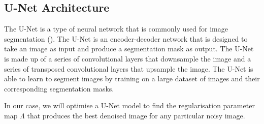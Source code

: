 \documentclass[12pt]{article}
\begin{document}







\subsection{U-Net Architecture}

The U-Net is a type of neural network that is commonly used for image segmentation (\cite{ronneberger2015unet}).
The U-Net is an encoder-decoder network that is designed to take an image as input and produce a segmentation mask as output.
The U-Net is made up of a series of convolutional layers that downsample the image and a series of transposed convolutional layers that upsample the image.
The U-Net is able to learn to segment images by training on a large dataset of images and their corresponding segmentation masks.


In our case, we will optimise a U-Net model to find the regularisation parameter map 
$\Lambda$ 
that produces the best denoised image for any particular noisy image.





\end{document}
